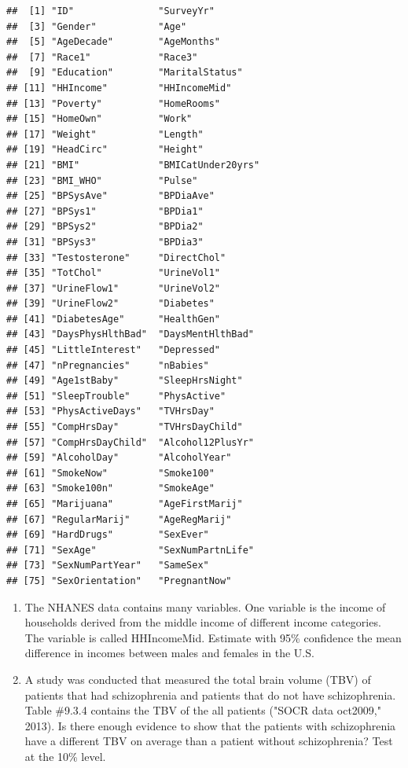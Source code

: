 \documentclass[
]{book}
\begin{document}
\begin{verbatim}
##  [1] "ID"               "SurveyYr"        
##  [3] "Gender"           "Age"             
##  [5] "AgeDecade"        "AgeMonths"       
##  [7] "Race1"            "Race3"           
##  [9] "Education"        "MaritalStatus"   
## [11] "HHIncome"         "HHIncomeMid"     
## [13] "Poverty"          "HomeRooms"       
## [15] "HomeOwn"          "Work"            
## [17] "Weight"           "Length"          
## [19] "HeadCirc"         "Height"          
## [21] "BMI"              "BMICatUnder20yrs"
## [23] "BMI_WHO"          "Pulse"           
## [25] "BPSysAve"         "BPDiaAve"        
## [27] "BPSys1"           "BPDia1"          
## [29] "BPSys2"           "BPDia2"          
## [31] "BPSys3"           "BPDia3"          
## [33] "Testosterone"     "DirectChol"      
## [35] "TotChol"          "UrineVol1"       
## [37] "UrineFlow1"       "UrineVol2"       
## [39] "UrineFlow2"       "Diabetes"        
## [41] "DiabetesAge"      "HealthGen"       
## [43] "DaysPhysHlthBad"  "DaysMentHlthBad" 
## [45] "LittleInterest"   "Depressed"       
## [47] "nPregnancies"     "nBabies"         
## [49] "Age1stBaby"       "SleepHrsNight"   
## [51] "SleepTrouble"     "PhysActive"      
## [53] "PhysActiveDays"   "TVHrsDay"        
## [55] "CompHrsDay"       "TVHrsDayChild"   
## [57] "CompHrsDayChild"  "Alcohol12PlusYr" 
## [59] "AlcoholDay"       "AlcoholYear"     
## [61] "SmokeNow"         "Smoke100"        
## [63] "Smoke100n"        "SmokeAge"        
## [65] "Marijuana"        "AgeFirstMarij"   
## [67] "RegularMarij"     "AgeRegMarij"     
## [69] "HardDrugs"        "SexEver"         
## [71] "SexAge"           "SexNumPartnLife" 
## [73] "SexNumPartYear"   "SameSex"         
## [75] "SexOrientation"   "PregnantNow"
\end{verbatim}

\begin{enumerate}
\def\labelenumi{\arabic{enumi}.}
\setcounter{enumi}{1}
\item
  The NHANES data contains many variables. One variable is the income of households derived from the middle income of different income categories. The variable is called HHIncomeMid. Estimate with 95\% confidence the mean difference in incomes between males and females in the U.S.
\item
  A study was conducted that measured the total brain volume (TBV) of patients that had schizophrenia and patients that do not have schizophrenia. Table \#9.3.4 contains the TBV of the all patients ("SOCR data oct2009," 2013). Is there enough evidence to show that the patients with schizophrenia have a different TBV on average than a patient without schizophrenia? Test at the 10\% level.
\end{enumerate}
\end{document}
